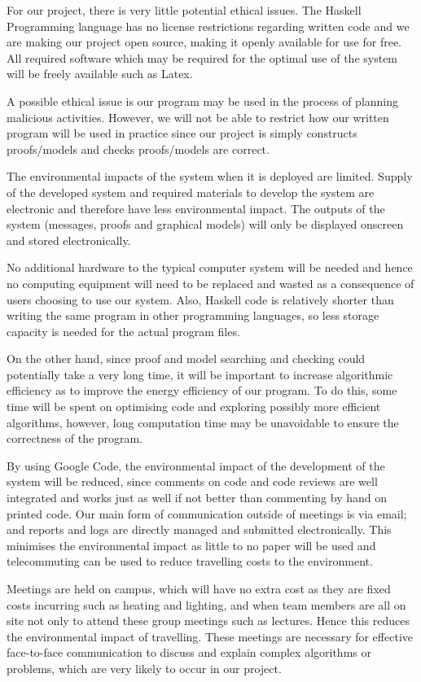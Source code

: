 For our project, there is very little potential ethical issues. The Haskell Programming language has no license restrictions regarding written code and we are making our project open source, making it openly available for use for free. All required software which may be required for the optimal use of the system will be freely available such as Latex.

A possible ethical issue is our program may be used in the process of planning malicious activities. However, we will not be able to restrict how our written program will be used in practice since our project is simply constructs proofs/models and checks proofs/models are correct.

The environmental impacts of the system when it is deployed are limited. Supply of the developed system and required materials to develop the system are electronic and therefore have less environmental impact. The outputs of the system (messages, proofs and graphical models) will only be displayed onscreen and stored electronically.

No additional hardware to the typical computer system will be needed and hence no computing equipment will need to be replaced and wasted as a consequence of users choosing to use our system. Also, Haskell code is relatively shorter than writing the same program in other programming languages, so less storage capacity is needed for the actual program files.

On the other hand, since proof and model searching and checking could potentially take a very long time, it will be important to increase algorithmic efficiency as to improve the energy efficiency of our program. To do this, some time will be spent on optimising code and exploring possibly more efficient algorithms, however, long computation time may be unavoidable to ensure the correctness of the program.

By using Google Code, the environmental impact of the development of the system will be reduced, since comments on code and code reviews are well integrated and works just as well if not better than commenting by hand on printed code. Our main form of communication outside of meetings is via email; and reports and logs are directly managed and submitted electronically. This minimises the environmental impact as little to no paper will be used and telecommuting can be used to reduce travelling costs to the environment.

Meetings are held on campus, which will have no extra cost as they are fixed costs incurring such as heating and lighting, and when team members are all on site not only to attend these group meetings such as lectures. Hence this reduces the environmental impact of travelling. These meetings are necessary for effective face-to-face communication to discuss and explain complex algorithms or problems, which are very likely to occur in our project.